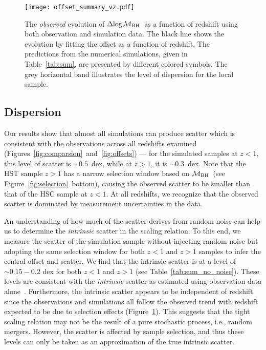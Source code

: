 \documentclass[twocolumn]{aastex631}
\newcommand{\ding}[1]{\textcolor{red}{[{\bf Xuheng}: #1]}}
\def\mbh{$\mathcal M_{\rm BH}$}
\begin{document}
\begin{figure}
\centering
\texttt{[image: offset\_summary\_vz.pdf]}%
\caption{\label{fig:offsets_vz} 
The {\it observed} evolution of $\Delta{\rm log}$\mbh\ as a function of redshift using both observation and simulation data. The black line shows the evolution by fitting the offset as a function of redshift. The predictions from the numerical simulations, given in Table~\ref{tab:sum}, are presented by different colored symbols. The grey horizontal band illustrates the level of dispersion for the local sample.
}
\end{figure} 

\subsection{Dispersion}

Our results show that almost all simulations can produce scatter which is consistent with the observations across all redshifts examined (Figures~\ref{fig:comparsion}~and~\ref{fig:offsets}) --- for the simulated samples at $z<1$, this level of scatter is $\sim0.5$~dex, while at $z>1$, it is $\sim0.3$~dex. Note that the HST sample $z>1$ has a narrow selection window based on \mbh\ (see Figure~\ref{fig:selection}~bottom), causing the observed scatter to be smaller than that of the HSC sample at $z<1$. At all redshifts, we recognize that the observed scatter is dominated by measurement uncertainties in the data. 

An understanding of how much of the scatter derives from random noise can help us to determine the {\it intrinsic} scatter in the scaling relation. To this end, we measure the scatter of the simulation sample without injecting random noise but adopting the same selection window for both $z<1$ and $z>1$ samples to infer the central offset and scatter. We find that the intrinsic scatter is at a level of $\sim0.15-0.2$ dex for both $z<1$ and $z>1$ (see Table~\ref{tab:sum_no_noise}). These levels are consistent with the {\it intrinsic} scatter as estimated using observation data alone~\citep{Ding2020, 2021arXiv210902751L}. Furthermore, the intrinsic scatter appears to be independent of redshift since the observations and simulations all follow the observed trend with redshift expected to be due to selection effects (Figure~\ref{fig:offsets_vz}). This suggests that the tight scaling relation may not be the result of a pure stochastic process, i.e., random mergers. However, the scatter is affected by sample selection, and thus these levels can only be taken as an approximation of the true intrinsic scatter.
\end{document}
